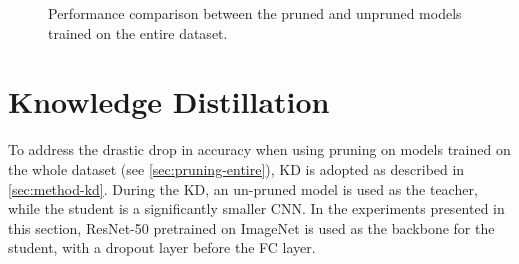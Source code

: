 \begin{figure}[H]
	\centering
    \qquad
	\caption{Performance comparison between the pruned and unpruned models trained on the entire dataset.}%
	\label{fig:exp7}
\end{figure}

\newpage


\section{Knowledge Distillation}
\label{sec:exp-kd}
To address the drastic drop in accuracy when using pruning on models trained on the whole dataset (see \autoref{sec:pruning-entire}), KD is adopted as described in \autoref{sec:method-kd}. During the KD, an un-pruned model is used as the teacher, while the student is a significantly smaller CNN. In the experiments presented in this section, ResNet-50 pretrained on ImageNet is used as the backbone for the student, with a dropout layer before the FC layer.


